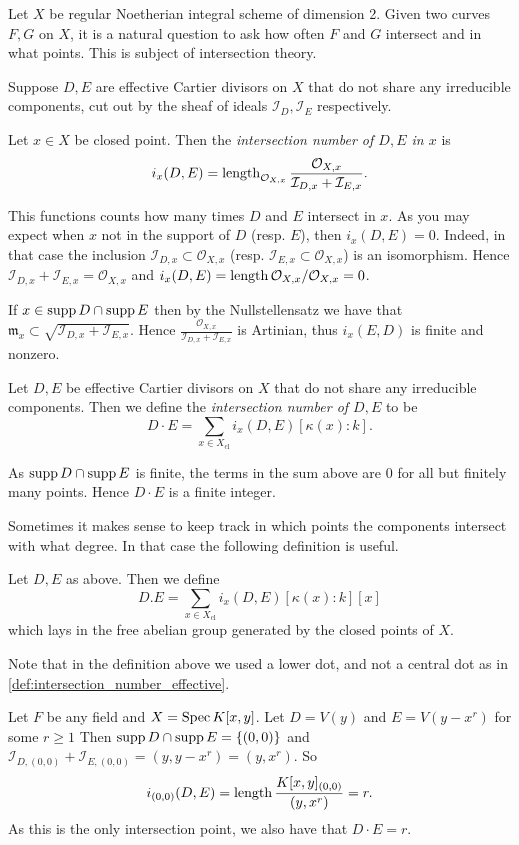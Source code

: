 Let $X$ be regular Noetherian integral scheme of dimension 2. 
Given two curves $F, G$ on $X$, it is a natural question to ask how often $F$ and $G$ intersect and in what points. 
This is subject of intersection theory. 

\begin{definition}
	Suppose $D, E$ are effective Cartier divisors on $X$ that do not share any irreducible components, cut out by the sheaf of ideals $\mathcal{I} _D, \mathcal{I} _E$ respectively.

	Let $x \in X$ be closed point. Then the \emph{intersection number of $D, E$ in $x$} is \[
		i_x(D, E) = \operatorname{length}_{\mathcal{O}_{X, x}} \frac{\mathcal{O}_{X, x}}{\mathcal{I}_{D,x} + \mathcal{I}_{E,x}} 
	.\]  
\end{definition}

This functions counts how many times $ D$ and $E$ intersect in $x$. 
As you may expect when  $x$ not in the support of $D$ (resp. $E$), then $i_x(D, E) = 0$. 
Indeed, in that case the inclusion $\mathcal{I}_{D, x} \subset  \mathcal{O}_{X, x}$ (resp. $\mathcal{I} _{E, x}\subset \mathcal{O}_{X,x}$) is an isomorphism. 
Hence $\mathcal{I}_{D, x} + \mathcal{I} _{E, x} = \mathcal{O}_{X, x}$ and $i_x(D, E) = \operatorname{length} \mathcal{O}_{X, x} /\mathcal{O}_{X, x} = 0$. 

If $x \in \operatorname{supp} D \cap \operatorname{supp} E$ then by the Nullstellensatz we have that $\mathfrak{m} _x \subset  \sqrt{\mathcal{I} _{D, x} + \mathcal{I} _{E, x}} $. 
Hence $\frac{\mathcal{O}_{X, x}}{\mathcal{I}_{D,x} + \mathcal{I}_{E,x}}$ is Artinian, thus $i_x(E, D)$ is finite and nonzero. 

\begin{definition}\label{def:intersection_number_effective}
	Let $D, E$ be effective Cartier divisors on $X$ that do not share any irreducible components.
	Then we define the \emph{intersection number of $D, E$} to be \[
		D\cdot E = \sum_{x \in X_\text{cl} }i_x (D, E)[\kappa(x): k]
	.\] 
\end{definition}
As $\operatorname{supp} D \cap \operatorname{supp} E$ is finite, the terms in the sum above are $0$ for all but finitely many points. Hence $D\cdot E$ is a finite integer. 

Sometimes it makes sense to keep track in which points the components intersect with what degree. In that case the following definition is useful. 
\begin{definition}
	Let $D, E$ as above. 
	Then we define \[
		D.E = \sum_{x \in X_\text{cl} } i_x(D, E)[\kappa(x) :k] [x]
	\] 
	which lays in the free abelian group generated by the closed points of $X$.
\end{definition}
Note that in the definition above we used a lower dot, and not a central dot as in \cref{def:intersection_number_effective}.
\begin{example}
	Let $F$ be any field and $X = \operatorname{Spec} K[x, y]$. 
	Let  $D = V(y)$ and $E = V(y - x^r)$ for some $r \ge 1$
	Then  $\operatorname{supp} D \cap \operatorname{supp} E = \{(0, 0)\} $ and $\mathcal{I} _{D, (0,0)} + \mathcal{I} _{E, (0,0)} = (y, y-x^r) = (y, x^r)$.
	So \[
		i_{(0,0)}(D, E) = \operatorname{length} \frac{K[x, y]_{(0, 0)}}{(y, x^{r})} = r
	.\] 
	As this is the only intersection point, we also have that $D\cdot E = r$. 
\end{example}

